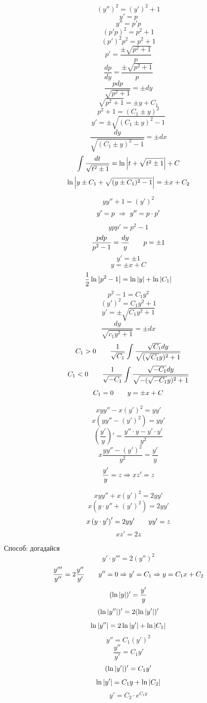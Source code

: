 \documentclass[12pt, fleqn]{article}
\begin{document}
\begin{lect}
        \begin{Task}[436]
            \[(y'')^2 = (y')^2 + 1\]
            \[y' = p\]
            \[y''= p'p\]
            \[(p'p)^2 = p^2 + 1\]
            \[(p')^2p^2 = p^2 + 1\]
            \[p' = \frac{\pm \sqrt{p^2 + 1}}{p}\]
            \[\frac{dp}{dy} = \frac{\pm \sqrt{p^2 + 1}}{p}\]
            \[\frac{pdp}{\sqrt{p^2 + 1}} = \pm dy\]
            \[\sqrt{p^2 + 1} = \pm y + C_1\]
            \[p^2 + 1 = (C_1 \pm y)^2\]
            \[y' = \pm \sqrt{(C_1 \pm y)^2 - 1}\]
            \[\frac{dy}{\sqrt{(C_1 \pm y)^2 - 1}} = \pm dx \]
            \[\int \frac{dt}{\sqrt{t^2 \pm 1}} = \ln \left|t + \sqrt{t^2 \pm 1}\right| + C \]
            \[\ln \left|y \pm C_1 + \sqrt{(y \pm C_1)^2 - 1}\right| = \pm x + C_2\]
        \end{Task}

        \begin{Task}[226]
            \[yy'' + 1 = (y')^2\]
            \[y' = p\ \Rightarrow\ y'' = p \cdot p'\]
            \[ypp' = p^2 - 1\]
            \[\frac{pdp}{p^2 - 1} = \frac{dy}{y} \qquad p = \pm 1\]
            \[y' = \pm 1\]
            \[y = \pm x + C\]
            \[\frac{1}{2}\ln\left|p^2 - 1\right| = \ln\left|y\right| + \ln \left|C_1\right|\]
            \[p^2 - 1 = C_1y^2\]
            \[(y')^2 = C_1y^2 + 1\]
            \[y' = \pm \sqrt{C_1 y^2 + 1}\]
            \[\frac{dy}{\sqrt{c_1y^2 + 1}} = \pm dx\]
            \[C_1 > 0 \qquad \frac{1}{\sqrt{C_1}} \int \frac{\sqrt{C_1}dy}{\sqrt{(\sqrt{C_1}y)^2 + 1}}\]
            \[C_1 < 0 \qquad \frac{1}{\sqrt{-C_1}} \int \frac{\sqrt{-C_1}dy}{\sqrt{-(\sqrt{-C_1}y)^2 + 1}}\]
            \[C_1 = 0 \qquad y = \pm x + C\]
        \end{Task}

        \begin{Task}[?]
            \[xyy'' - x(y')^2 = yy'\]
            \[x(yy'' - (y')^2) = yy'\]
            \[\left(\frac{y'}{y}\right)' = \frac{y'' \cdot y - y' \cdot y'}{y^2}\]
            \[x\frac{yy'' - (y')^2}{y^2} = \frac{y'}{y}\]
            \[\frac{y'}{y} = z \Rightarrow xz' = z\]
        \end{Task}

        \begin{Task}[366]
            \[xyy'' + x(y')^2 = 2yy'\]
            \[x(y \cdot y'' + (y')^2) = 2yy'\]
            \[x\left(y \cdot y'\right)' = 2yy' \qquad yy' = z\]
            \[xz' = 2z\]
        \end{Task}


        \begin{Task}[466]
            Способ: догадайся
            \[y' \cdot y''' = 2(y'')^2\]
            \[\frac{y'''}{y''} = 2 \frac{y''}{y'} \qquad y'' = 0 \Rightarrow y' = C_1 \Rightarrow y = C_1x + C_2\]
            \[(\ln \left|y\right|)' = \frac{y'}{y}\]
            \[(\ln \left|y''\right|)' = 2(\ln \left|y'\right|)'\]
            \[\ln \left|y''\right| = 2\ln \left|y'\right| + \ln \left|C_1\right|\]
            \[y'' = C_1 (y')^2\]
            \[\frac{y''}{y'} = C_1 y'\]
            \[(\ln \left|y'\right|)' = C_1 y'\]
            \[\ln \left|y'\right| = C_1 y + \ln \left|C_2\right|\]
            \[y' = C_2 \cdot e^{C_1 y} \]
        \end{Task}


\end{lect}
\end{document}
